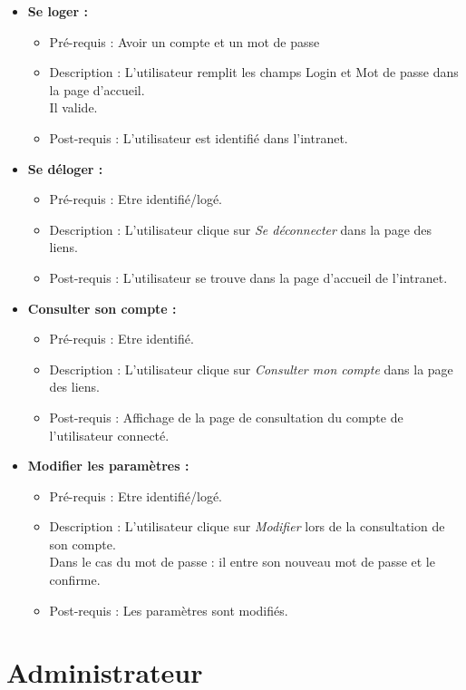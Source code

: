 \begin{itemize}
\item  {\bf Se loger :}
	\begin{itemize}
	\item Pr{\'e}-requis : Avoir un compte et un mot de passe
	\item Description : L'utilisateur remplit les
	champs Login et Mot de passe dans la page d'accueil.\\
	Il valide.
	\item Post-requis : L'utilisateur est identifi{\'e} dans l'intranet.
	\end{itemize}
\item  {\bf Se d{\'e}loger :}
	\begin{itemize}
	\item Pr{\'e}-requis : Etre identifi{\'e}/log{\'e}. 
	\item Description : L'utilisateur clique sur
	{\it Se d{\'e}connecter} dans la page des liens.
	\item Post-requis : L'utilisateur se trouve dans la page d'accueil de l'intranet.
	\end{itemize}
\item  {\bf Consulter son compte :}
	\begin{itemize}
	\item  Pr{\'e}-requis : Etre identifi{\'e}.
	\item Description : L'utilisateur clique sur
	{\it Consulter mon compte} dans la page des liens. 
	\item Post-requis : Affichage de la page de
	consultation du compte de l'utilisateur connect{\'e}.
	\end{itemize}
\item  {\bf Modifier les param{\`e}tres :}
	\begin{itemize}
	\item Pr{\'e}-requis : Etre identifi{\'e}/log{\'e}. 
	\item Description : L'utilisateur clique sur
	{\it Modifier} lors de la consultation de son compte.\\
	Dans le cas du mot de passe : il entre son
	nouveau mot de passe et le confirme.
	\item Post-requis : Les param{\`e}tres sont modifi{\'e}s.
	\end{itemize}
\end{itemize}

\section*{Administrateur}

